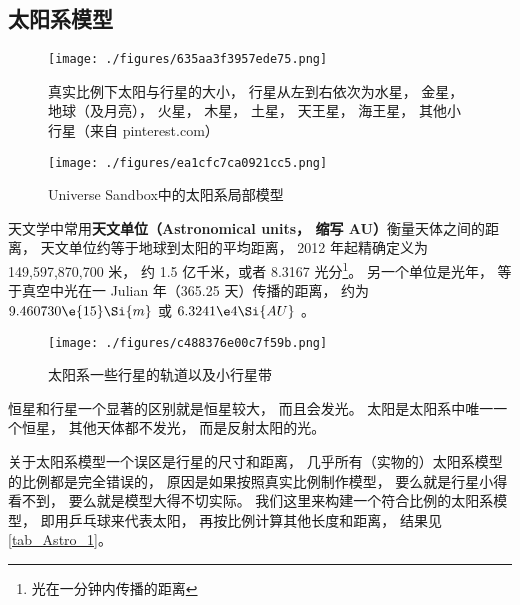 
\subsection{太阳系模型}

\begin{figure}[ht]
\centering
\texttt{[image: ./figures/635aa3f3957ede75.png]}
\caption{真实比例下太阳与行星的大小， 行星从左到右依次为水星， 金星， 地球（及月亮）， 火星， 木星， 土星， 天王星， 海王星， 其他小行星（来自 pinterest.com）} \label{fig_Astro_1}
\end{figure}

\begin{figure}[ht]
\centering
\texttt{[image: ./figures/ea1cfc7ca0921cc5.png]}
\caption{Universe Sandbox中的太阳系局部模型} \label{fig_Astro_9}
\end{figure}

天文学中常用\textbf{天文单位（Astronomical units， 缩写 AU）}衡量天体之间的距离， 天文单位约等于地球到太阳的平均距离， 2012 年起精确定义为 149,597,870,700 米， 约 1.5 亿千米，或者 8.3167 光分\footnote{光在一分钟内传播的距离}。 另一个单位是光年， 等于真空中光在一 Julian 年（365.25 天）传播的距离， 约为 $9.460730\e{15}\Si{m}$ 或 $6.3241\e4\Si{AU}$ 。

\begin{figure}[ht]
\centering
\texttt{[image: ./figures/c488376e00c7f59b.png]}
\caption{太阳系一些行星的轨道以及小行星带} \label{fig_Astro_3}
\end{figure}

恒星和行星一个显著的区别就是恒星较大， 而且会发光。 太阳是太阳系中唯一一个恒星， 其他天体都不发光， 而是反射太阳的光。

关于太阳系模型一个误区是行星的尺寸和距离， 几乎所有（实物的）太阳系模型的比例都是完全错误的， 原因是如果按照真实比例制作模型， 要么就是行星小得看不到， 要么就是模型大得不切实际。 我们这里来构建一个符合比例的太阳系模型， 即用乒乓球来代表太阳， 再按比例计算其他长度和距离， 结果见\autoref{tab_Astro_1}。

